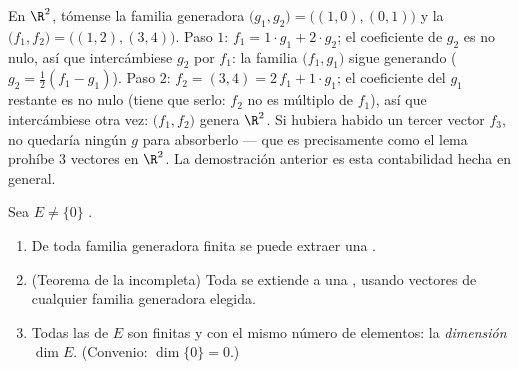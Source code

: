 \begin{example}
\label{ex:b1:findim:exchangerun}
En $\R^2$, tómense la familia generadora
$\bigl(g_1, g_2\bigr) = \bigl((1,0), (0,1)\bigr)$ y la 
$\bigl(f_1, f_2\bigr) = \bigl((1,2), (3,4)\bigr)$. Paso $1$:
$f_1 = 1\cdot g_1 + 2\cdot g_2$; el coeficiente de $g_2$ es no nulo,
así que intercámbiese $g_2$ por $f_1$: la familia
$\bigl(f_1, g_1\bigr)$ sigue generando ($g_2 = \frac12(f_1 - g_1)$).
Paso $2$: $f_2 = (3,4) = 2\,f_1 + 1\cdot g_1$; el coeficiente del
$g_1$ restante es no nulo (tiene que serlo: $f_2$ no es múltiplo de
$f_1$), así que intercámbiese otra vez: $\bigl(f_1, f_2\bigr)$ genera
$\R^2$. Si hubiera habido un tercer vector  $f_3$, no quedaría
ningún $g$ para absorberlo --- que es precisamente como el lema
prohíbe $3$ vectores  en $\R^2$. La demostración anterior es
esta contabilidad hecha en general.
\end{example}

\begin{theorem}\label{thm:b1:findim:bases}
Sea $E \neq \{0\}$ .
\begin{enumerate}
  \item De toda familia generadora finita se puede extraer una .
  \item (Teorema de la  incompleta) Toda  se extiende a una ,
        usando vectores de cualquier familia generadora elegida.
  \item Todas las  de $E$ son finitas y con el mismo número de
        elementos: la \emph{dimensión} $\dim E$. (Convenio:
        $\dim\{0\} = 0$.)
\end{enumerate}
\end{theorem}

